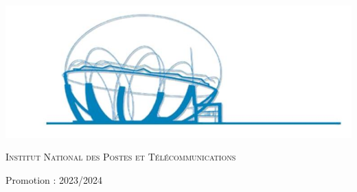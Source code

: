 \begin{center}
    \vspace{0.5cm}
    \includegraphics[scale=0.6]{Logos/ZLAFA.png}


    \textsc{Institut National des Postes et Télécommunications}

    {\large Promotion : 2023/2024}

\end{center}


